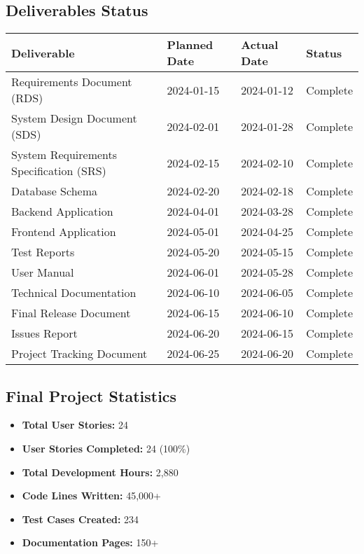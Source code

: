 \documentclass[12pt,a4paper]{article}
\begin{document}
\subsection{Deliverables Status}
\begin{longtable}{|p{4cm}|p{3cm}|p{3cm}|p{3cm}|}
\hline
\rowcolor{lightgray}
\textbf{Deliverable} & \textbf{Planned Date} & \textbf{Actual Date} & \textbf{Status} \\
\hline
Requirements Document (RDS) & 2024-01-15 & 2024-01-12 & \cellcolor{completedgreen}Complete \\
\hline
System Design Document (SDS) & 2024-02-01 & 2024-01-28 & \cellcolor{completedgreen}Complete \\
\hline
System Requirements Specification (SRS) & 2024-02-15 & 2024-02-10 & \cellcolor{completedgreen}Complete \\
\hline
Database Schema & 2024-02-20 & 2024-02-18 & \cellcolor{completedgreen}Complete \\
\hline
Backend Application & 2024-04-01 & 2024-03-28 & \cellcolor{completedgreen}Complete \\
\hline
Frontend Application & 2024-05-01 & 2024-04-25 & \cellcolor{completedgreen}Complete \\
\hline
Test Reports & 2024-05-20 & 2024-05-15 & \cellcolor{completedgreen}Complete \\
\hline
User Manual & 2024-06-01 & 2024-05-28 & \cellcolor{completedgreen}Complete \\
\hline
Technical Documentation & 2024-06-10 & 2024-06-05 & \cellcolor{completedgreen}Complete \\
\hline
Final Release Document & 2024-06-15 & 2024-06-10 & \cellcolor{completedgreen}Complete \\
\hline
Issues Report & 2024-06-20 & 2024-06-15 & \cellcolor{completedgreen}Complete \\
\hline
Project Tracking Document & 2024-06-25 & 2024-06-20 & \cellcolor{completedgreen}Complete \\
\hline
\end{longtable}

\subsection{Final Project Statistics}
\begin{itemize}
    \item \textbf{Total User Stories:} 24
    \item \textbf{User Stories Completed:} 24 (100\%)
    \item \textbf{Total Development Hours:} 2,880
    \item \textbf{Code Lines Written:} 45,000+
    \item \textbf{Test Cases Created:} 234
    \item \textbf{Documentation Pages:} 150+
\end{itemize}
\end{document}
